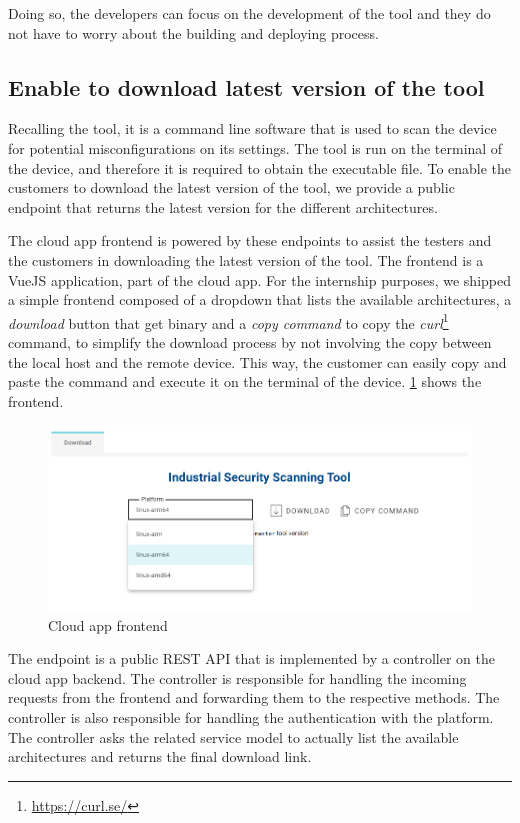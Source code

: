 Doing so, the developers can focus on the development of the tool and they do not have to worry about the building and deploying process.

\subsection{Enable to download latest version of the tool}

Recalling the tool, it is a command line software that is used to scan the device for potential misconfigurations on its settings. The tool is run on the terminal of the device, and therefore it is required to obtain the executable file. To enable the customers to download the latest version of the tool, we provide a public endpoint that returns the latest version for the different architectures.

The cloud app frontend is powered by these endpoints to assist the testers and the customers in downloading the latest version of the tool. The frontend is a VueJS application, part of the cloud app. For the internship purposes, we shipped a simple frontend composed of a dropdown that lists the available architectures, a \textit{download} button that get binary and a \textit{copy command} to copy the \textit{curl}\footnote{\url{https://curl.se/}} command, to simplify the download process by not involving the copy between the local host and the remote device. This way, the customer can easily copy and paste the command and execute it on the terminal of the device. \cref{fig:cloud-app-frontend} shows the frontend.

\begin{figure}[ht]
  \centering
  \includegraphics[width=1.0\textwidth]{chapters/05/assets/cloud-app-frontend}
  \caption{Cloud app frontend}
  \label{fig:cloud-app-frontend}
\end{figure}

The endpoint is a public REST API that is implemented by a controller on the cloud app backend. The controller is responsible for handling the incoming requests from the frontend and forwarding them to the respective methods. The controller is also responsible for handling the authentication with the platform. The controller asks the related service model to actually list the available architectures and returns the final download link.

